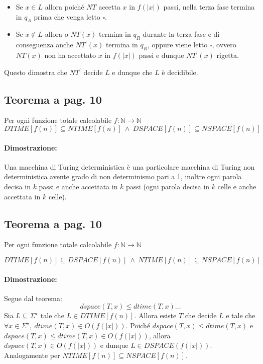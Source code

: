 \begin{itemize}
    \item {
        Se $x\in L$ allora poiché $NT$ accetta $x$ in $f(|x|)$ passi, nella terza fase termina in $q_{A}$ prima che venga
        letto $\square$.
    }
    \item {
        Se $x\notin L$ allora o $NT(x)$ termina in $q_{R}$ durante la terza fase e di conseguenza anche $NT^{'}(x)$ termina in $q_{R}$,
        oppure viene letto $\square$, ovvero $NT(x)$ non ha accettato $x$ in $f(|x|)$ passi e dunque $NT^{'}(x)$ rigetta.
    }
\end{itemize}
Questo dimostra che $NT^{'}$ decide $L$ e dunque che $L$ è decidibile.
\subsection{Teorema a pag. 10}

Per ogni funzione totale calcolabile $f: \mathbb{N} \rightarrow \mathbb{N}$ 
$$DTIME[f(n)] \subseteq NTIME[f(n)]\ \land\ DSPACE[f(n)] \subseteq NSPACE[f(n)]$$ 

\paragraph*{Dimostrazione:} Una macchina di Turing deterministica è una particolare macchina di Turing non deterministica 
avente grado di non determinismo pari a 1, inoltre ogni parola decisa in $k$ passi e anche accettata in $k$ passi 
(ogni parola decisa in $k$ celle e anche accettata in $k$ celle).

\newpage
\subsection{Teorema a pag. 10}

Per ogni funzione totale calcolabile $f: \mathbb{N} \rightarrow \mathbb{N}$ 

$$DTIME[f(n)] \subseteq DSPACE[f(n)]\ \land\ NTIME[f(n)] \subseteq NSPACE[f(n)]$$ 

\paragraph*{Dimostrazione:} Segue dal teorema:
$$dspace(T, x) \leq dtime(T, x)\dots$$
Sia $L \subseteq \Sigma^{\star}$ tale che $L \in DTIME[f(n)]$. Allora esiste $T$ che decide $L$ e tale che 
$\forall x\in \Sigma^{\star},\ dtime(T, x) \in O(f(|x|))$. Poiché $dspace(T, x) \leq dtime(T, x)$ e $dspace(T, x) \leq dtime(T, x) \in O(f(|x|))$,
allora $dspace(T, x) \in O(f(|x|))$ e dunque $L \in DSPACE(f(|x|))$. Analogamente per $NTIME[f(n)] \subseteq NSPACE[f(n)]$.

